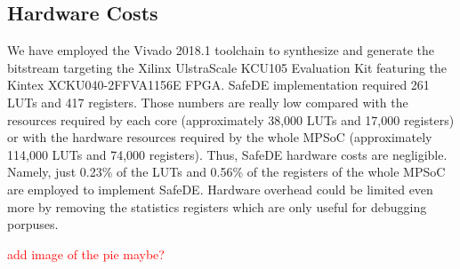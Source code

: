 \subsection{Hardware Costs}
\label{section:Hardware_resources}

We have employed the Vivado 2018.1 toolchain to synthesize and generate the bitstream targeting the Xilinx UlstraScale KCU105 Evaluation Kit featuring the Kintex XCKU040-2FFVA1156E FPGA. SafeDE implementation required 261 LUTs and 417 registers. Those numbers are really low compared with the resources required by each core (approximately 38,000 LUTs and 17,000 registers) or with the hardware resources required by the whole MPSoC (approximately 114,000 LUTs and 74,000 registers). Thus, SafeDE hardware costs are negligible. Namely, just 0.23\% of the LUTs and 0.56\% of the registers of the whole MPSoC are employed to implement SafeDE. Hardware overhead could be limited even more by removing the statistics registers which are only useful for debugging porpuses.

\textcolor{red}{add image of the pie maybe?}
\bigskip


